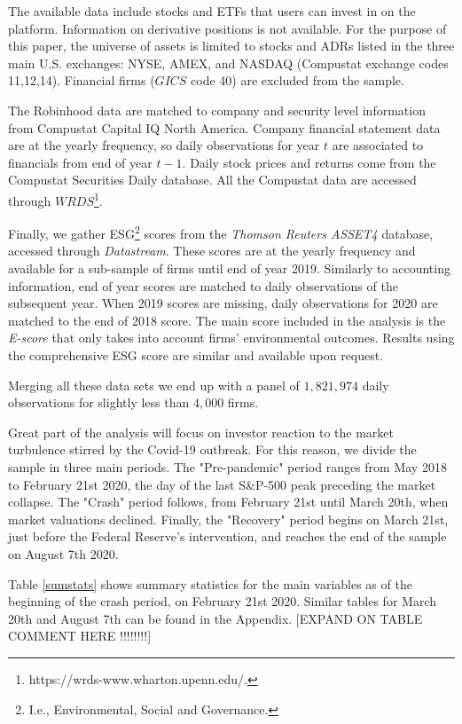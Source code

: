 \documentclass[12pt]{article}
\numberwithin{equation}{section} %
\begin{document}
The available data include stocks and ETFs that users can invest in on the platform. Information on derivative positions is not available. For the purpose of this paper, the universe of assets is limited to stocks and ADRs listed in the three main U.S. exchanges: NYSE, AMEX, and NASDAQ (Compustat exchange codes 11,12,14). Financial firms ($GICS$ code 40) are excluded from the sample.

The Robinhood data are matched to company and security level information from Compustat Capital IQ North America. Company financial statement data are at the yearly frequency, so daily observations for year $t$ are associated to financials from end of year $t-1$. Daily stock prices and returns come from the Compustat Securities Daily database. All the Compustat data are accessed through $WRDS$\footnote{https://wrds-www.wharton.upenn.edu/.}.

Finally, we gather ESG\footnote{I.e., Environmental, Social and Governance.} scores from the \textit{Thomson Reuters ASSET4} database, accessed through \textit{Datastream}. These scores are at the yearly frequency and available for a sub-sample of firms until end of year 2019. Similarly to accounting information, end of year scores are matched to daily observations of the subsequent year. When 2019 scores are missing, daily observations for 2020 are matched to the end of 2018 score. The main score included in the analysis is the \textit{E-score} that only takes into account firms' environmental outcomes. Results using the comprehensive ESG score are similar and available upon request.  

Merging all these data sets we end up with a panel of $1,821,974$ daily observations for slightly less than $4,000$ firms.

Great part of the analysis will focus on investor reaction to the market turbulence stirred by the Covid-19 outbreak. For this reason, we divide the sample in three main periods. The "Pre-pandemic" period ranges from May 2018 to February 21st 2020, the day of the last S\&P-500 peak preceding the market collapse. The "Crash" period follows, from February 21st until March 20th, when market valuations declined. Finally, the "Recovery" period begins on March 21st, just before the Federal Reserve's intervention, and reaches the end of the sample on August 7th 2020.

Table \ref{sumstats} shows summary statistics for the main variables as of the beginning of the crash period, on February 21st 2020. Similar tables for March 20th and August 7th can be found in the Appendix. [EXPAND ON TABLE COMMENT HERE !!!!!!!!]
\end{document}
